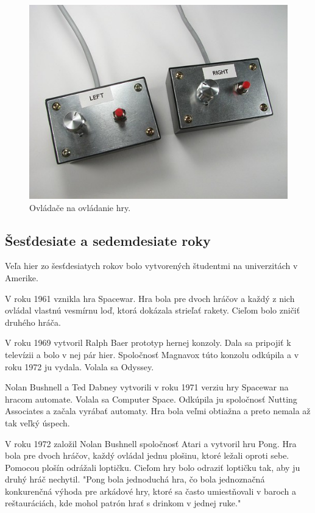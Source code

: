 \documentclass[10pt,oneside,slovak,a4paper]{article}
\begin{document}
\begin{figure}[tbh]
\centering
\includegraphics[scale=0.35]{tenis2.jpg}
\caption{Ovládače na ovládanie hry.}
\label{tenis2}
\end{figure}

\subsection{Šesťdesiate a sedemdesiate roky} \label{sedemdesiate}

Veľa hier zo šesťdesiatych rokov bolo vytvorených študentmi na univerzitách v Amerike. 

V roku 1961 vznikla hra Spacewar. Hra bola pre dvoch hráčov a každý z nich ovládal vlastnú vesmírnu loď, ktorá dokázala strieľať rakety. Cieľom bolo zničiť druhého hráča.

V roku 1969 vytvoril Ralph Baer prototyp hernej konzoly. Dala sa pripojiť k televízii a bolo v nej pár hier. Spoločnosť Magnavox túto konzolu odkúpila a v roku 1972 ju vydala. Volala sa Odyssey.

Nolan Bushnell a Ted Dabney vytvorili v roku 1971 verziu hry Spacewar na hracom automate. Volala sa Computer Space. Odkúpila ju spoločnosť Nutting Associates a začala vyrábať automaty. Hra bola veľmi obtiažna a preto nemala až tak veľký úspech.

V roku 1972 založil Nolan Bushnell spoločnosť Atari a vytvoril hru Pong. Hra bola pre dvoch hráčov, každý ovládal jednu plošinu, ktoré ležali oproti sebe. Pomocou plošín odrážali loptičku. Cieľom hry bolo odraziť loptičku tak, aby ju druhý hráč nechytil. "Pong bola jednoduchá hra, čo bola jednoznačná konkurenčná výhoda pre arkádové hry, ktoré sa často umiestňovali v baroch a reštauráciách, kde mohol patrón hrať s drinkom v jednej ruke."\cite{Lowood}
\end{document}
